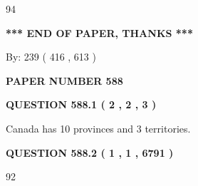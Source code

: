 \documentclass[12pt]{article}
\begin{document}
  
 
 
\noindent{}

94
 
 
   
   
 \vspace{0.2in}
 
   
   
   
   
\vspace{1.0in} 
{\textbf{\large{ *** END OF PAPER, THANKS *** }}} 
   
   
\hspace{1.0in} By: 
 239 ( 416 ,  613 )
   
   
   
   
\newpage 
\setcounter{page}{ 
   588001 } 
   
   
   
   
 {\textbf{ \Large{ PAPER NUMBER  588  }}}
   
   
\vspace{0.2in}
   
   
   
   
   
   
 \vspace{0.2in}
 
 
 
 
   
   
  
\vspace{0.2in}
  
{\textbf{\Large{QUESTION
588.1 
 ( 2 , 2 , 3 )
}}}
  
  
 
 
\noindent{}
 
 
Canada has 10  provinces and 3 territories.
 
 
 
 
  
\vspace{0.2in}
  
{\textbf{\Large{QUESTION
588.2 
 ( 1 , 1 , 6791 )
}}}
  
  
 
 
\noindent{}

92
 
\end{document}
